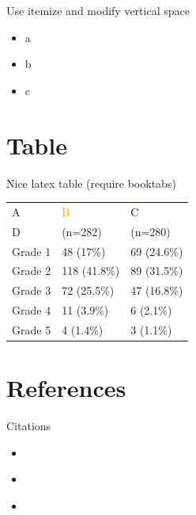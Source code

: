 \documentclass[table]{beamer}
\begin{document}
\begin{frame}[label={sec:orgc08f21c}]{Use itemize and modify vertical space}
\begin{itemize}[label={-},topsep=0pt,itemsep=5ex,partopsep=1ex,parsep=1ex]
\item a
\item b
\item c
\end{itemize}
\end{frame}

\section{Table}
\label{sec:org3877ab4}

\begin{frame}[label={sec:org6b230f3}]{Nice latex table}
(require booktabs)

\begin{table}
\begin{tabular}{lll}
\toprule
A  & \textcolor{orange}{B} & \textcolor{blue}{C} \\
D & (n=282)  & (n=280) \\
\midrule
Grade 1 & 48 (17\%)  & 69 (24.6\%) \\
Grade 2 & 118 (41.8\%)  & 89 (31.5\%) \\
Grade 3 & 72 (25.5\%)  & 47 (16.8\%) \\
Grade 4 & 11 (3.9\%) & 6 (2.1\%) \\
Grade 5 & 4 (1.4\%)  & 3 (1.1\%) \\
\bottomrule
\end{tabular}
\end{table}
\end{frame}

\section{References}
\label{sec:org33e30c5}

\begin{frame}[label={sec:org7a231f8}]{Citations}
\begin{itemize}
\item \citep{pearson1905problem}
\item \cite{pearson1905problem}
\item \citep[xx]{pearson1905problem}
\end{itemize}
\cite[p.~150]{pearson1905problem}
\end{frame}
\end{document}
